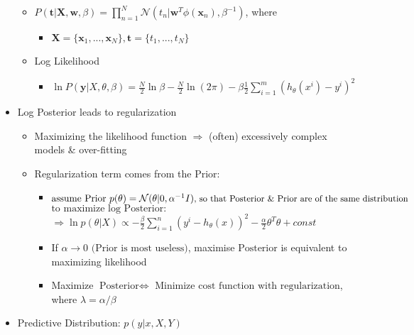 \begin{itemize}
	\begin{itemize}
	\item $\displaystyle P(\mathbf t|\mathbf X,\mathbf w,\beta) = \prod_{n=1}^N \mathcal N(t_n|\mathbf w ^T\phi(\mathbf x_n), \beta^{-1})$, where
		\begin{itemize}
		\item $\mathbf X = \{ \mathbf x_1,...,\mathbf x_N \}, \mathbf t = \{ t_1,...,t_N \}$
		\end{itemize}
	\item Log Likelihood 
		\begin{itemize}
			\item $\displaystyle \ln P(\boldsymbol y|X,\theta,\beta) = \frac N 2\ln\beta - \frac N 2 \ln(2\pi) - \beta \frac 1 2\sum_{i=1}^m (h_\theta(x^i) - y^i)^2$
		\end{itemize}
	 
	\end{itemize}

\item Log Posterior leads to regularization

	\begin{itemize}
	\item Maximizing the likelihood function $\Rightarrow$ (often) excessively complex models \& over-fitting
	\item Regularization term comes from the $\text{Prior}$: 
		\begin{itemize}
		\item $\text{assume Prior } p(\theta) =  \mathcal{N}(\theta|0,\alpha^{-1}I) \text{\small , so that Posterior \& Prior are of the same distribution}$ \\
		$\text{to maximize log Posterior}:$ \\ 
		$\displaystyle \Rightarrow \ln p(\theta|X) \propto -\frac \beta 2 \sum_{i=1}^n (y^i - h_\theta(x))^2 - \frac \alpha 2 \theta^T\theta + const$
		
		\item If $\alpha \to 0 \text { (Prior is most useless)}$, maximise $\text{Posterior}$ is equivalent to maximizing likelihood 
		\item Maximize $\text{Posterior} \Leftrightarrow$ Minimize $\text{cost function with regularization}$, where $\lambda = \alpha/\beta$ 
		\end{itemize}
	\end{itemize}
		
\item Predictive Distribution: $p(y|x,X,Y)$ 


\end{itemize}
